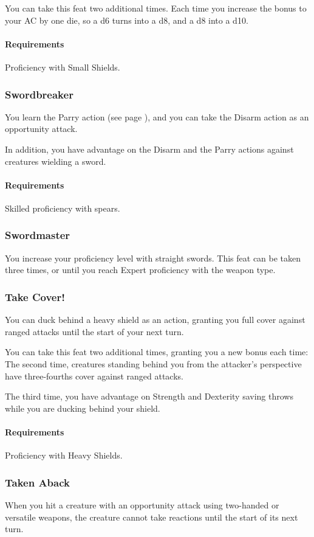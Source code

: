     You can take this feat two additional times.
    Each time you increase the bonus to your AC by one die, so a d6 turns into a d8, and a d8 into a d10.
    \paragraph{Requirements} Proficiency with Small Shields.
\subsubsection{Swordbreaker} \label{feat::swordbreaker}
    You learn the Parry action (see page \pageref{act::parry}), and you can take the Disarm action as an opportunity attack.

    In addition, you have advantage on the Disarm and the Parry actions against creatures wielding a sword.
    \paragraph{Requirements} Skilled proficiency with spears.
\subsubsection{Swordmaster} \label{feat::swordmaster}
    You increase your proficiency level with straight swords.
    This feat can be taken three times, or until you reach Expert proficiency with the weapon type.
\subsubsection{Take Cover!} \label{feat::takecover}
    You can duck behind a heavy shield as an action, granting you full cover against ranged attacks until the start of your next turn.

    You can take this feat two additional times, granting you a new bonus each time:
    The second time, creatures standing behind you from the attacker's perspective have three-fourths cover against ranged attacks.

    The third time, you have advantage on Strength and Dexterity saving throws while you are ducking behind your shield.
    \paragraph{Requirements} Proficiency with Heavy Shields.
\subsubsection{Taken Aback} \label{feat::takenaback}
    When you hit a creature with an opportunity attack using two-handed or versatile weapons, the creature cannot take reactions until the start of its next turn.
